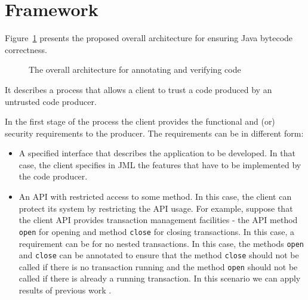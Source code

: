 \section{Framework}
\label{architecture_s}	
Figure~\ref{architecture} presents the proposed overall architecture for ensuring Java bytecode correctness. 

\begin{figure}[!tbp]
\begin{center}
\caption{The overall architecture for annotating and verifying code}
\label{architecture}
\end{center}
\end{figure}

It describes a process that allows a client to trust a code produced by an untrusted code producer.

In the first stage of the process the client provides the functional and (or) security requirements to the producer. The requirements can be in different form:
\begin{itemize}
\item A specified interface that describes the application to be developed. In that case,
 the client specifies in JML the features that have to be implemented by the code producer.
\item An API with restricted access to some method. In this case, the client can protect its system by restricting the API usage.
For example, suppose that the client API provides transaction management facilities - the API method \texttt{open} for opening and method \texttt{close} for closing transactions. In this case, a requirement can be for no nested transactions.
In this case, the methods \texttt{open} and \texttt{close} can be annotated to ensure that the method \texttt{close} 
 should not be called if there is no transaction running and the method \texttt{open} should not be called if there is already a running transaction. In this scenario we can apply results of previous work \cite{PBBHL}.  
\end{itemize}


